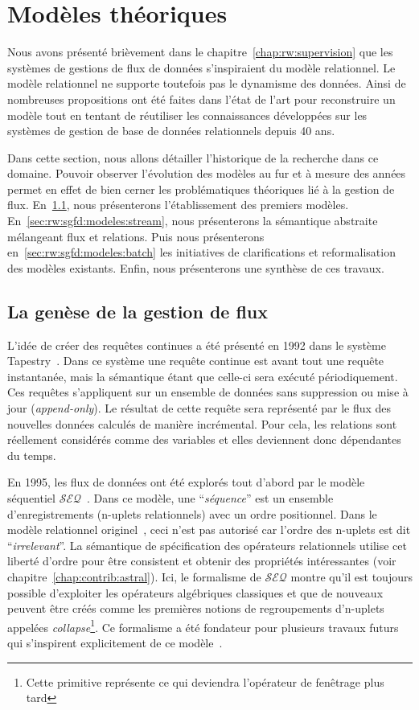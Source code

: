 \section{Modèles théoriques}\label{sec:rw:sgfd:modeles}
Nous avons présenté brièvement dans le chapitre~\ref{chap:rw:supervision} que les systèmes de gestions de flux de données s'inspiraient du modèle relationnel. Le modèle relationnel ne supporte toutefois pas le dynamisme des données. Ainsi de nombreuses propositions ont été faites dans l'état de l'art pour reconstruire un modèle tout en tentant de réutiliser les connaissances développées sur les systèmes de gestion de base de données relationnels depuis 40 ans.

Dans cette section, nous allons détailler l'historique de la recherche dans ce domaine. Pouvoir observer l'évolution des modèles au fur et à mesure des années permet en effet de bien cerner les problématiques théoriques lié à la gestion de flux. En~\ref{sec:rw:sgfd:modeles:early}, nous présenterons l'établissement des premiers modèles. En~\ref{sec:rw:sgfd:modeles:stream}, nous présenterons la sémantique abstraite mélangeant flux et relations. Puis nous présenterons en~\ref{sec:rw:sgfd:modeles:batch} les initiatives de clarifications et reformalisation des modèles existants. Enfin, nous présenterons une synthèse de ces travaux.

\subsection{La genèse de la gestion de flux}\label{sec:rw:sgfd:modeles:early}
L'idée de créer des requêtes continues a été présenté en 1992 dans le système Tapestry~\cite{Terry:tapestry}. Dans ce système une requête continue est avant tout une requête instantanée, mais la sémantique étant que celle-ci sera exécuté périodiquement. Ces requêtes s'appliquent sur un ensemble de données sans suppression ou mise à jour (\textit{append-only}). Le résultat de cette requête sera représenté par le flux des nouvelles données calculés de manière incrémental. Pour cela, les relations sont réellement considérés comme des variables et elles deviennent donc dépendantes du temps.

En 1995, les flux de données ont été explorés tout d'abord par le modèle séquentiel $\mathcal{SEQ}$~\cite{Seshadri:seq}. Dans ce modèle, une \enquote{\it séquence} est un ensemble d'enregistrements (n-uplets relationnels) avec un ordre positionnel. Dans le modèle relationnel originel~\cite{Codd:model}, ceci n'est pas autorisé car l'ordre des n-uplets est dit \enquote{\it irrelevant}. La sémantique de spécification des opérateurs relationnels utilise cet liberté d'ordre pour être consistent et obtenir des propriétés intéressantes (voir chapitre~\ref{chap:contrib:astral}). Ici, le formalisme de $\mathcal{SEQ}$ montre qu'il est toujours possible d'exploiter les opérateurs algébriques classiques et que de nouveaux peuvent être créés comme les premières notions de regroupements d'n-uplets appelées \textit{collapse}\footnote{Cette primitive représente ce qui deviendra l'opérateur de fenêtrage plus tard}. Ce formalisme a été fondateur pour plusieurs travaux futurs qui s'inspirent explicitement de ce modèle~\cite{Gurgen:sens,Babcock:issues}.


